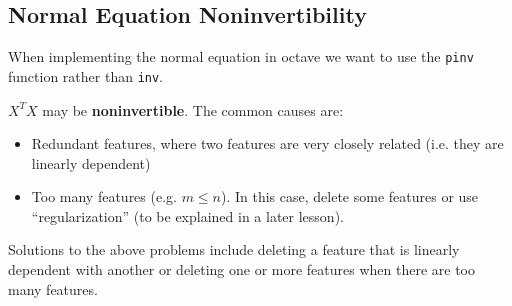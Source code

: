 \subsection*{Normal Equation Noninvertibility}
When implementing the normal equation in octave we want to use the \verb|pinv| function rather than \verb|inv|.

$X^TX$ may be {\bf noninvertible}. The common causes are:
\begin{itemize}
	\item Redundant features, where two features are very closely related (i.e. they are linearly dependent)
	\item Too many features (e.g. $m\leq n$). In this case, delete some features or use ``regularization'' (to be explained in a later lesson).
\end{itemize}
Solutions to the above problems include deleting a feature that is linearly dependent with another or deleting one or more features when there are too many features.